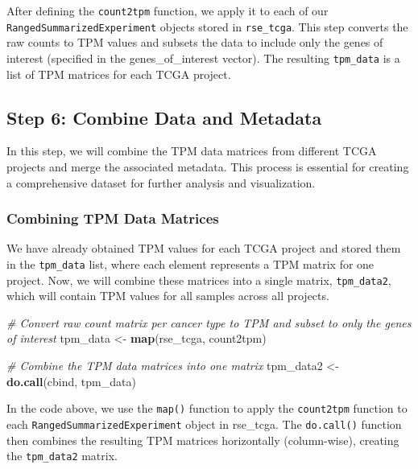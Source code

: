 \documentclass[
]{book}
\newenvironment{Shaded}{\begin{snugshade}}{\end{snugshade}}
\newcommand{\CommentTok}[1]{\textcolor[rgb]{0.56,0.35,0.01}{\textit{#1}}}
\newcommand{\FunctionTok}[1]{\textcolor[rgb]{0.13,0.29,0.53}{\textbf{#1}}}
\newcommand{\NormalTok}[1]{#1}
\newcommand{\OtherTok}[1]{\textcolor[rgb]{0.56,0.35,0.01}{#1}}
\begin{document}
After defining the \texttt{count2tpm} function, we apply it to each of our \texttt{RangedSummarizedExperiment} objects stored in \texttt{rse\_tcga}. This step converts the raw counts to TPM values and subsets the data to include only the genes of interest (specified in the genes\_of\_interest vector). The resulting \texttt{tpm\_data} is a list of TPM matrices for each TCGA project.

\hypertarget{step-6-combine-data-and-metadata}{%
\subsection{Step 6: Combine Data and Metadata}\label{step-6-combine-data-and-metadata}}

In this step, we will combine the TPM data matrices from different TCGA projects and merge the associated metadata. This process is essential for creating a comprehensive dataset for further analysis and visualization.

\hypertarget{combining-tpm-data-matrices}{%
\subsubsection{Combining TPM Data Matrices}\label{combining-tpm-data-matrices}}

We have already obtained TPM values for each TCGA project and stored them in the \texttt{tpm\_data} list, where each element represents a TPM matrix for one project. Now, we will combine these matrices into a single matrix, \texttt{tpm\_data2}, which will contain TPM values for all samples across all projects.

\begin{Shaded}
\begin{Highlighting}[]
\CommentTok{\# Convert raw count matrix per cancer type to TPM and subset to only the genes of interest}
\NormalTok{tpm\_data }\OtherTok{\textless{}{-}} \FunctionTok{map}\NormalTok{(rse\_tcga, count2tpm)}

\CommentTok{\# Combine the TPM data matrices into one matrix}
\NormalTok{tpm\_data2 }\OtherTok{\textless{}{-}} \FunctionTok{do.call}\NormalTok{(cbind, tpm\_data)}
\end{Highlighting}
\end{Shaded}

In the code above, we use the \texttt{map()} function to apply the \texttt{count2tpm} function to each \texttt{RangedSummarizedExperiment} object in rse\_tcga. The \texttt{do.call()} function then combines the resulting TPM matrices horizontally (column-wise), creating the \texttt{tpm\_data2} matrix.
\end{document}
